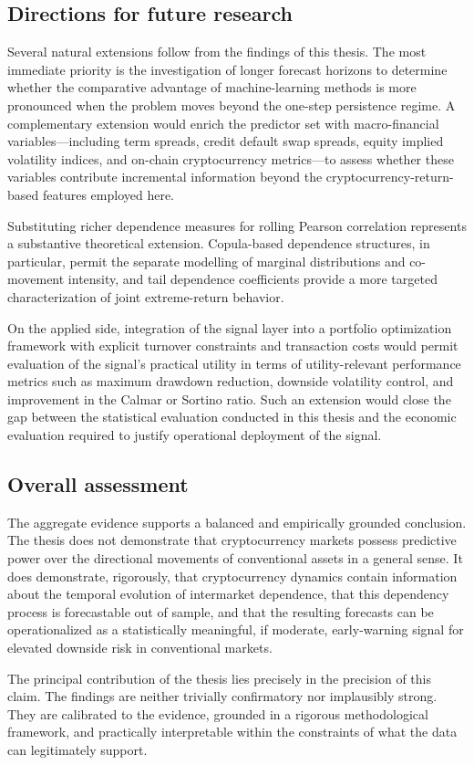 \subsection{Directions for future research}

Several natural extensions follow from the findings of this thesis. The most immediate priority is the investigation of longer forecast horizons to determine whether the comparative advantage of machine-learning methods is more pronounced when the problem moves beyond the one-step persistence regime. A complementary extension would enrich the predictor set with macro-financial variables---including term spreads, credit default swap spreads, equity implied volatility indices, and on-chain cryptocurrency metrics---to assess whether these variables contribute incremental information beyond the cryptocurrency-return-based features employed here.

Substituting richer dependence measures for rolling Pearson correlation represents a substantive theoretical extension. Copula-based dependence structures, in particular, permit the separate modelling of marginal distributions and co-movement intensity, and tail dependence coefficients provide a more targeted characterization of joint extreme-return behavior.

On the applied side, integration of the signal layer into a portfolio optimization framework with explicit turnover constraints and transaction costs would permit evaluation of the signal's practical utility in terms of utility-relevant performance metrics such as maximum drawdown reduction, downside volatility control, and improvement in the Calmar or Sortino ratio. Such an extension would close the gap between the statistical evaluation conducted in this thesis and the economic evaluation required to justify operational deployment of the signal.

\subsection{Overall assessment}

The aggregate evidence supports a balanced and empirically grounded conclusion. The thesis does not demonstrate that cryptocurrency markets possess predictive power over the directional movements of conventional assets in a general sense. It does demonstrate, rigorously, that cryptocurrency dynamics contain information about the temporal evolution of intermarket dependence, that this dependency process is forecastable out of sample, and that the resulting forecasts can be operationalized as a statistically meaningful, if moderate, early-warning signal for elevated downside risk in conventional markets.

The principal contribution of the thesis lies precisely in the precision of this claim. The findings are neither trivially confirmatory nor implausibly strong. They are calibrated to the evidence, grounded in a rigorous methodological framework, and practically interpretable within the constraints of what the data can legitimately support.
